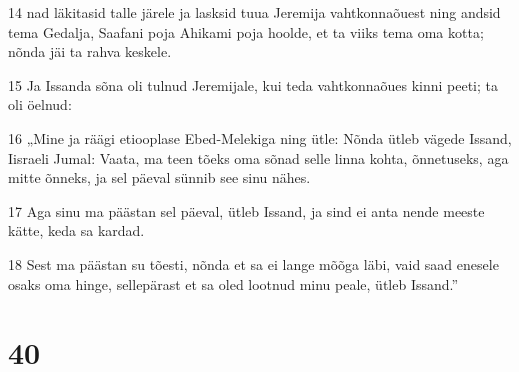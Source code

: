 \par 14 nad läkitasid talle järele ja lasksid tuua Jeremija vahtkonnaõuest ning andsid tema Gedalja, Saafani poja Ahikami poja hoolde, et ta viiks tema oma kotta; nõnda jäi ta rahva keskele.
\par 15 Ja Issanda sõna oli tulnud Jeremijale, kui teda vahtkonnaõues kinni peeti; ta oli öelnud:
\par 16 „Mine ja räägi etiooplase Ebed-Melekiga ning ütle: Nõnda ütleb vägede Issand, Iisraeli Jumal: Vaata, ma teen tõeks oma sõnad selle linna kohta, õnnetuseks, aga mitte õnneks, ja sel päeval sünnib see sinu nähes.
\par 17 Aga sinu ma päästan sel päeval, ütleb Issand, ja sind ei anta nende meeste kätte, keda sa kardad.
\par 18 Sest ma päästan su tõesti, nõnda et sa ei lange mõõga läbi, vaid saad enesele osaks oma hinge, sellepärast et sa oled lootnud minu peale, ütleb Issand.”

\chapter{40}

